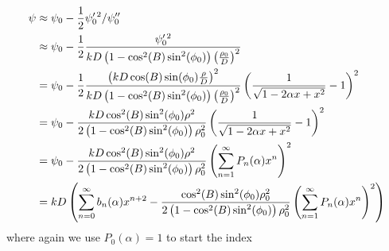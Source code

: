 \documentclass{article}
\begin{document}
        \begin{subequations}
            \begin{align}
                \psi
                &\approx\psi_{0}-
                    \frac{1}{2}\psi^{\prime\,2}_{0}/\psi^{\prime\prime}_{0}\\
                &\approx
                \psi_{0}-\frac{1}{2}
                \frac{\psi^{\prime\,2}_{0}}{%
                    kD\left(1-\cos^{2}(B)\sin^{2}(\phi_{0})\right)
                    \left(\frac{\rho_{0}}{D}\right)^{2}
                }\\
                &=\psi_{0}-\frac{1}{2}
                    \frac{%
                        \left(
                            kD\cos(B)\sin(\phi_{0})\frac{\rho}{D}
                        \right)^{2}
                    }{%
                        kD\left(1-\cos^{2}(B)\sin^{2}(\phi_{0})\right)
                        \left(\frac{\rho_{0}}{D}\right)^{2}
                    }\left(
                        \frac{1}{\sqrt{1-2\alpha{x}+x^{2}}}-1
                    \right)^{2}\\
                &=\psi_{0}-
                    \frac{%
                        kD\cos^{2}(B)\sin^{2}(\phi_{0})\rho^{2}%
                    }{%
                        2\left(
                            1-\cos^{2}(B)\sin^{2}(\phi_{0})
                        \right)\rho_{0}^{2}
                    }\left(
                        \frac{1}{\sqrt{1-2\alpha{x}+x^{2}}}-1
                    \right)^{2}\\
                &=\psi_{0}-
                    \frac{%
                        kD\cos^{2}(B)\sin^{2}(\phi_{0})\rho^{2}%
                    }{%
                        2\left(1-\cos^{2}(B)\sin^{2}(\phi_{0})\right)
                        \rho_{0}^{2}
                    }\left(
                        \sum_{n=1}^{\infty}P_{n}(\alpha)x^{n}
                    \right)^{2}\\
                &=kD\left(
                    \sum_{n=0}^{\infty}b_{n}(\alpha)x^{n+2}-
                    \frac{%
                        \cos^{2}(B)\sin^{2}(\phi_{0})\rho_{0}^{2}
                    }{%
                        2\left(1-\cos^{2}(B)\sin^{2}(\phi_{0})\right)
                        \rho_{0}^{2}
                    }\left(
                        \sum_{n=1}^{\infty}P_{n}(\alpha)x^{n}
                    \right)^{2}
                \right)
            \end{align}
        \end{subequations}
        where again we use $P_{0}(\alpha)=1$ to start the index
\end{document}
